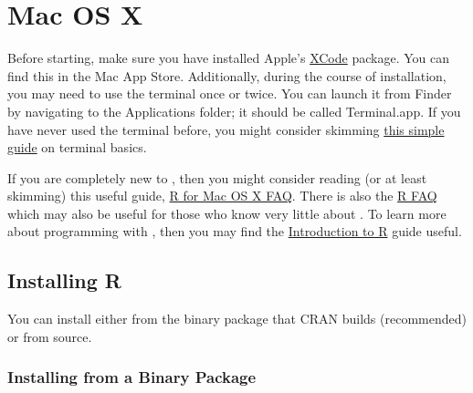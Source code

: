 \section{Mac OS X}

Before starting, make sure you have installed Apple's \href{https://developer.apple.com/xcode/}{XCode} package.  You can find this in the Mac App Store.  Additionally, during the course of installation, you may need to use the terminal once or twice.  You can launch it from Finder by navigating to the Applications folder; it should be called Terminal.app.  If you have never used the terminal before, you might consider skimming \href{http://guides.macrumors.com/Terminal}{this simple guide} on terminal basics.

If you are completely new to , then you might consider reading (or at least skimming) this useful guide, \href{http://cran.r-project.org/bin/macosx/RMacOSX-FAQ.html}{R for Mac OS X FAQ}.  There is also the \href{http://cran.r-project.org/doc/FAQ/R-FAQ.html}{R FAQ} which may also be useful for those who know very little about .  To learn more about programming with , then you may find the \href{http://cran.us.r-project.org/doc/manuals/R-intro.html}{Introduction to R} guide useful.



\subsection{Installing R}

You can install  either from the binary package that CRAN builds (recommended) or from source.

\subsubsection{Installing from a Binary Package}

